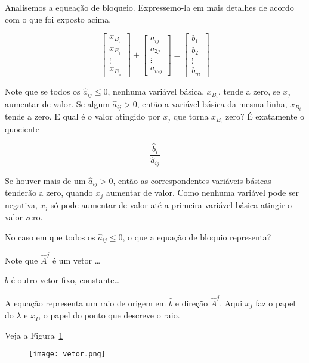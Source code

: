 Analisemos a equeação de bloqueio.
Expressemo-la em mais detalhes de acordo com o que foi exposto acima.

\[
  \begin{bmatrix}
    x_{B_{_1}} \\
    x_{B_{_2}} \\
    \vdots     \\
    x_{B_{_m}} 
  \end{bmatrix}  
  +
  \begin{bmatrix}
    a_{ij} \\
    a_{2j} \\
    \vdots \\
    a_{mj}
  \end{bmatrix}
  =
  \begin{bmatrix}
    b_{1}  \\
    b_{2}  \\
    \vdots \\
    b_{m}
  \end{bmatrix}
\]

Note que se todos os $ \widehat{a}_{ij} \leq 0 $, nenhuma variável básica,
$ x_{B_{i}} $, tende a zero, se $ x_j $ aumentar de valor.
Se algum $ \widehat{a}_{ij} > 0 $, então a variável básica da mesma linha, 
$ x_{B_{i}} $ tende a zero.
E qual é o valor atingido por $ x_j $ que torna $ x_{B_i} $ zero?
É exatamente o quociente 

\[
  \frac{\widehat{b}_i}{\widehat{a}_{ij}}
\]

Se houver mais de um $ \widehat{a}_{ij} > 0 $, então as correspondentes variáveis
básicas tenderão a zero, quando $ x_j $ aumentar de valor.
Como nenhuma variável pode ser negativa, $ x_j $ só pode aumentar de valor até
a primeira variável básica atingir o valor zero.

No caso em que todos os $ \widehat{a}_{ij} \leq 0 $, o que a equação de bloquio
representa?

Note que $ \widehat{A}^{j} $ é um vetor \ldots 

$ \widehat{b} $ é outro vetor fixo, constante\ldots

A equação representa um raio de origem  em $ \widehat{b} $ e direção 
$ \widehat{A}^j $.
Aqui $ x_j $ faz o papel do $ \lambda $ e $ x_I $, o papel do ponto que descreve
o raio.

Veja a Figura~\ref{fig:vetor}

\begin{figure}[!h]
  \centering
  \texttt{[image: vetor.png]}
  \caption{}
  \label{fig:vetor}
\end{figure}

